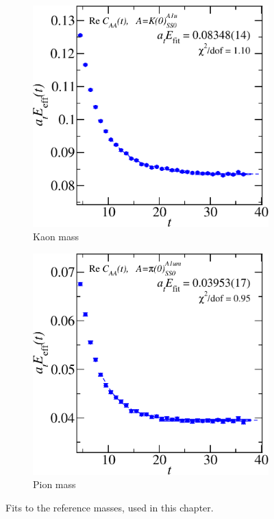 \begin{figure}
  \centering
  \begin{subfigure}{0.4\textwidth}
    \centering
    \includegraphics[width=\textwidth]{figures/kaon_crop.pdf}
    \caption{Kaon mass}\label{fig:kaon}
  \end{subfigure}\hfill
  \begin{subfigure}{0.4\textwidth}
    \centering
    \includegraphics[width=\textwidth]{figures/pion_crop.pdf}
    \caption{Pion mass}\label{fig:pion}
  \end{subfigure}
  \caption{Fits to the reference masses, used in this chapter.}
\end{figure}



